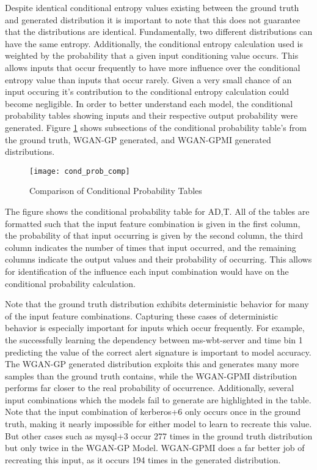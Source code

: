 Despite identical conditional entropy values existing between the ground truth and generated distribution it is important to note that this does not guarantee that the distributions are identical. Fundamentally, two different distributions can have the same entropy. Additionally, the conditional entropy calculation used is weighted by the probability that a given input conditioning value occurs. This allows inputs that occur frequently to have more influence over the conditional entropy value than inputs that occur rarely. Given a very small chance of an input occuring it's contribution to the conditional entropy calculation could become negligible. In order to better understand each model, the conditional probability tables showing inputs and their respective output probability were generated. Figure \ref{fig:make_this} shows subsections of the conditional probability table's from the ground truth, WGAN-GP generated, and WGAN-GPMI generated distributions. 

\begin{figure}[!htbp]
	\centering
	\texttt{[image: cond\_prob\_comp]}
	\caption{
		Comparison of Conditional Probability Tables
	}
	\label{fig:make_this}
\end{figure}

The figure shows the conditional probability table for A{\given}D,T. All of the tables are formatted such that the input feature combination is given in the first column, the probability of that input occurring is given by the second column, the third column indicates the number of times that input occurred, and the remaining columns indicate the output values and their probability of occurring. This allows for identification of the influence each input combination would have on the conditional probability calculation.

Note that the ground truth distribution exhibits deterministic behavior for many of the input feature combinations. Capturing these cases of deterministic behavior is especially important for inputs which occur frequently. For example, the successfully learning the dependency between ms-wbt-server and time bin 1 predicting the value of the correct alert signature is important to model accuracy. The WGAN-GP generated distribution exploits this and generates many more samples than the ground truth contains, while the WGAN-GPMI distribution performs far closer to the real probability of occurrence. Additionally, several input combinations which the models fail to generate are highlighted in the table. Note that the input combination of kerberos+6 only occurs once in the ground truth, making it nearly impossible for either model to learn to recreate this value. But other cases such as mysql+3 occur 277 times in the ground truth distribution but only twice in the WGAN-GP Model. WGAN-GPMI does a far better job of recreating this input, as it occurs 194 times in the generated distribution. 

